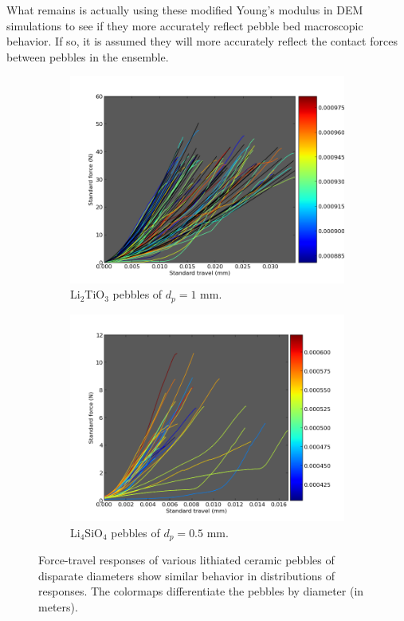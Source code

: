 What remains is actually using these modified Young's modulus in DEM simulations to see if they more accurately reflect pebble bed macroscopic behavior. If so, it is assumed they will more accurately reflect the contact forces between pebbles in the ensemble.




\begin{figure}[!htp]
  \centering
  \begin{subfigure}[b]{0.75\textwidth}
         \includegraphics[width=\textwidth]{chapters/figures/NFRI-data}
         \caption{Li$_2$TiO$_3$ pebbles of $d_p = 1$ \si{mm}.}
         \label{fig:nfri-force-travel-exp}
  \end{subfigure}

  \begin{subfigure}[b]{0.75\textwidth}
         \includegraphics[width=\textwidth]{chapters/figures/FZK-data}
         \caption{Li$_4$SiO$_4$ pebbles of $d_p = 0.5$ \si{mm}.}
         \label{fig:fzk-force-travel-exp}
  \end{subfigure}
  \caption{Force-travel responses of various lithiated ceramic pebbles of disparate diameters show similar behavior in distributions of responses. The colormaps differentiate the pebbles by diameter (in meters).}
\label{fig:force-travel-exp}
\end{figure}